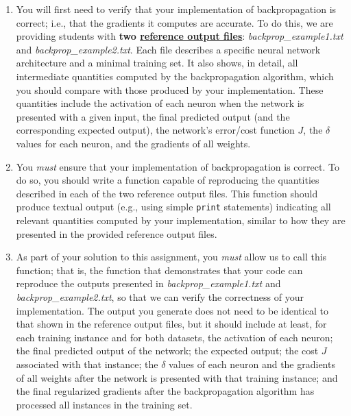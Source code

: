 \documentclass{article}
\begin{document}
\begin{enumerate}
\item You will first need to verify that your implementation of backpropagation is correct; i.e., that the gradients it computes are accurate. To do this, we are providing students with \textbf{two \ul{reference output files}}: \mbox{\emph{backprop\_example1.txt}} and \emph{backprop\_example2.txt}. Each file describes a specific neural network architecture and a minimal training set. It also shows, in detail, all intermediate quantities computed by the backpropagation algorithm, which you should compare with those produced by your implementation. These quantities include the activation of each neuron when the network is presented with a given input, the final predicted output (and the corresponding expected output), the network’s error/cost function $J$, the $\delta$ values for each neuron, and the gradients of all weights.

\item You \textit{must} ensure that your implementation of backpropagation is correct. To do so, you should write a function capable of reproducing the quantities described in each of the two reference output files. This function should produce textual output (e.g., using simple \texttt{print} statements) indicating all relevant quantities computed by your implementation, similar to how they are presented in the provided reference output files.

\item As part of your solution to this assignment, you \textit{must} allow us to call this function; that is, the function that demonstrates that your code can reproduce the outputs presented in \emph{backprop\_example1.txt} and \emph{backprop\_example2.txt}, so that we can verify the correctness of your implementation. The output you generate does not need to be identical to that shown in the reference output files, but it should include at least, for each training instance and for both datasets, the activation of each neuron; the final predicted output of the network; the expected output; the cost $J$ associated with that instance; the $\delta$ values of each neuron and the gradients of all weights after the network is presented with that training instance; and the final regularized gradients after the backpropagation algorithm has processed all instances in the training set.

\end{enumerate}

\vspace{0.5cm}
\end{document}
